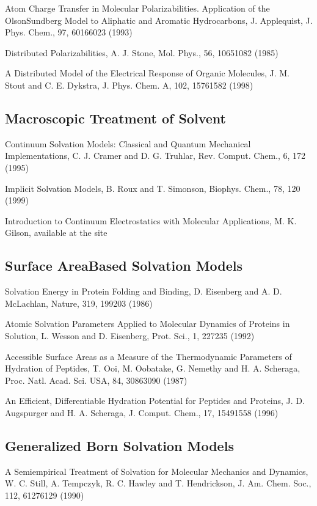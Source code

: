 \documentclass[letterpaper,11pt,english]{sphinxmanual}
\begin{document}
Atom Charge Transfer in Molecular Polarizabilities. Application of the Olson\sphinxhyphen{}Sundberg Model to Aliphatic and Aromatic Hydrocarbons, J. Applequist, J. Phys. Chem., 97, 6016\sphinxhyphen{}6023 (1993)

Distributed Polarizabilities, A. J. Stone, Mol. Phys., 56, 1065\sphinxhyphen{}1082 (1985)

A Distributed Model of the Electrical Response of Organic Molecules, J. M. Stout and C. E. Dykstra, J. Phys. Chem. A, 102, 1576\sphinxhyphen{}1582 (1998)


\subsection{Macroscopic Treatment of Solvent}
\label{\detokenize{text/references:macroscopic-treatment-of-solvent}}
Continuum Solvation Models: Classical and Quantum Mechanical Implementations, C. J. Cramer and D. G. Truhlar, Rev. Comput. Chem., 6, 1\sphinxhyphen{}72 (1995)

Implicit Solvation Models, B. Roux and T. Simonson, Biophys. Chem., 78, 1\sphinxhyphen{}20 (1999)

Introduction to Continuum Electrostatics with Molecular Applications, M. K. Gilson, available at the site 


\subsection{Surface Area\sphinxhyphen{}Based Solvation Models}
\label{\detokenize{text/references:surface-area-based-solvation-models}}
Solvation Energy in Protein Folding and Binding, D. Eisenberg and A. D. McLachlan, Nature, 319, 199\sphinxhyphen{}203 (1986)

Atomic Solvation Parameters Applied to Molecular Dynamics of Proteins in Solution, L. Wesson and D. Eisenberg, Prot. Sci., 1, 227\sphinxhyphen{}235 (1992)

Accessible Surface Areas as a Measure of the Thermodynamic Parameters of Hydration of Peptides, T. Ooi, M. Oobatake, G. Nemethy and H. A. Scheraga, Proc. Natl. Acad. Sci. USA, 84, 3086\sphinxhyphen{}3090 (1987)

An Efficient, Differentiable Hydration Potential for Peptides and Proteins, J. D. Augspurger and H. A. Scheraga, J. Comput. Chem., 17, 1549\sphinxhyphen{}1558 (1996)


\subsection{Generalized Born Solvation Models}
\label{\detokenize{text/references:generalized-born-solvation-models}}
A Semiempirical Treatment of Solvation for Molecular Mechanics and Dynamics, W. C. Still, A. Tempczyk, R. C. Hawley and T. Hendrickson, J. Am. Chem. Soc., 112, 6127\sphinxhyphen{}6129 (1990)
\end{document}

